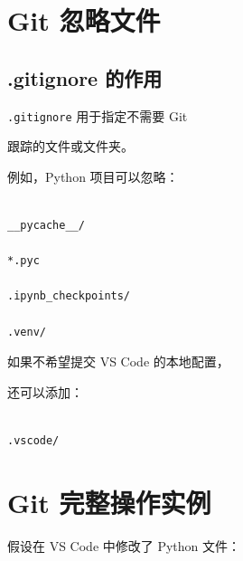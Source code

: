 \section{Git 忽略文件}



\subsection{.gitignore 的作用}



\texttt{.gitignore} 用于指定不需要 Git

跟踪的文件或文件夹。



例如，Python 项目可以忽略：



\begin{lstlisting}

__pycache__/

*.pyc

.ipynb_checkpoints/

.venv/

\end{lstlisting}



如果不希望提交 VS Code 的本地配置，

还可以添加：



\begin{lstlisting}

.vscode/

\end{lstlisting}














\section{Git 完整操作实例}



假设在 VS Code 中修改了 Python 文件：



